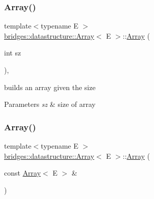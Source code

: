 \mbox{\label{classbridges_1_1datastructure_1_1_array_ad72d4311346c5b9e53ee8eff2a4aadce}} 
\subsubsection{\texorpdfstring{Array()}{Array()}\hspace{0.1cm}{\footnotesize\ttfamily [2/3]}}
{\footnotesize\ttfamily template$<$typename E $>$ \\
\hyperlink{classbridges_1_1datastructure_1_1_array}{bridges\+::datastructure\+::\+Array}$<$ E $>$\+::\hyperlink{classbridges_1_1datastructure_1_1_array}{Array} (\begin{DoxyParamCaption}\item[{int}]{sz }\end{DoxyParamCaption})\hspace{0.3cm}{\ttfamily [inline]}, {\ttfamily [protected]}}



builds an array given the size 


\begin{DoxyParams}{Parameters}
{\em sz} & size of array \\
\hline
\end{DoxyParams}
\mbox{\label{classbridges_1_1datastructure_1_1_array_abd017f8feb1d892e8559df6533354d3f}} 
\subsubsection{\texorpdfstring{Array()}{Array()}\hspace{0.1cm}{\footnotesize\ttfamily [3/3]}}
{\footnotesize\ttfamily template$<$typename E $>$ \\
\hyperlink{classbridges_1_1datastructure_1_1_array}{bridges\+::datastructure\+::\+Array}$<$ E $>$\+::\hyperlink{classbridges_1_1datastructure_1_1_array}{Array} (\begin{DoxyParamCaption}\item[{const \hyperlink{classbridges_1_1datastructure_1_1_array}{Array}$<$ E $>$ \&}]{ }\end{DoxyParamCaption})\hspace{0.3cm}{\ttfamily [delete]}}



